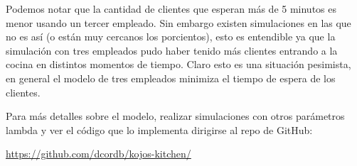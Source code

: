 \documentclass{article}
\begin{document}
        Podemos notar que la cantidad de clientes que esperan más de 5 minutos es menor usando un tercer empleado. Sin embargo existen simulaciones
        en las que no es así (o están muy cercanos los porcientos), esto es entendible ya que la simulación con tres empleados pudo haber tenido más clientes
        entrando a la cocina en distintos momentos de tiempo. Claro esto es una situación pesimista, en general el modelo de tres empleados minimiza el
        tiempo de espera de los clientes.

        Para más detalles sobre el modelo, realizar simulaciones con otros parámetros lambda y ver el código que lo implementa dirigirse al repo de GitHub:

        \href{https://github.com/dcordb/kojos-kitchen/}{https://github.com/dcordb/kojos-kitchen/}
\end{document}
